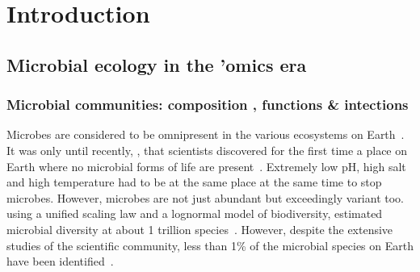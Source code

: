 \chapter{Introduction}
\label{cha:intro}


\section{Microbial ecology in the 'omics era}

   \subsection{Microbial communities: composition 
   , functions 
   \& intections 
   }



      Microbes are considered to be omnipresent in the 
      various ecosystems on Earth~\citep{falkowski2008microbial}.
      It was only until recently, \citeyear{belilla2019hyperdiverse}, that scientists discovered for the first time 
      a place on Earth where no microbial forms of life are present~\cite{belilla2019hyperdiverse}.
      Extremely low pH, high salt and high temperature had to be 
      at the same place at the same time to stop microbes.
      However, microbes are not just abundant but 
      exceedingly variant too.
      \citeauthor{locey2016scaling} using a unified scaling law
      and a lognormal model of biodiversity, 
      estimated microbial diversity at about 1 trillion species~\cite{locey2016scaling}.
      However, despite the extensive studies of the scientific community, 
      less than 1\% of the microbial species on Earth have been identified~\cite{isme}.
      
